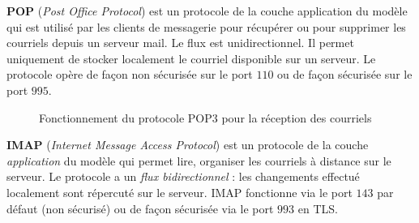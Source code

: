 \documentclass[a4paper, 14pt]{report}
\begin{document}
    \textbf{\textsf{POP}}  (\textit{Post Office Protocol}) 
    est un protocole de la couche 
        application du modèle qui est utilisé 
        par les clients de messagerie pour récupérer
        ou pour supprimer les courriels 
        depuis un serveur mail. Le flux est unidirectionnel. Il permet 
        uniquement de stocker localement le courriel disponible 
        sur un serveur. 
        Le protocole opère de façon 
        non sécurisée sur le port \(110\) ou de façon sécurisée 
        sur le port \( 995 \). 

\begin{figure}[H]
\begin{center}
\end{center}
\caption{Fonctionnement du protocole POP3 pour la réception des courriels}
\end{figure}
        \textbf{\textsf{IMAP}} (\textit{Internet Message Access Protocol})
        est un protocole de la couche \textit{application} du modèle 
        qui permet lire, organiser les courriels à distance  
        sur le serveur. Le protocole a un 
        \textit{flux bidirectionnel} : les changements                  
        effectué localement sont répercuté sur le serveur. 
        IMAP fonctionne via le port \(143\) par défaut 
        (non sécurisé) ou de façon sécurisée via le port 
        \( 993 \) en TLS.
\end{document}
